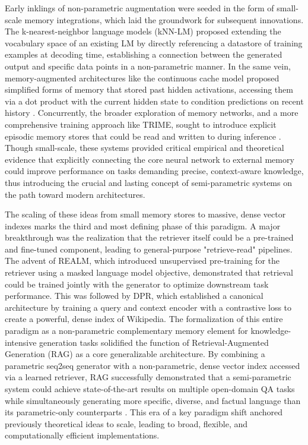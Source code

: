 \documentclass[11pt,a4paper]{article}
\begin{document}
Early inklings of non-parametric augmentation were seeded in the form of small-scale memory integrations, which laid the groundwork for subsequent innovations. The k-nearest-neighbor language models (kNN-LM) proposed extending the vocabulary space of an existing LM by directly referencing a datastore of training examples at decoding time, establishing a connection between the generated output and specific data points in a non-parametric manner. In the same vein, memory-augmented architectures like the continuous cache model proposed simplified forms of memory that stored past hidden activations, accessing them via a dot product with the current hidden state to condition predictions on recent history \cite{arxiv:1612.04426v1}. Concurrently, the broader exploration of memory networks, and a more comprehensive training approach like TRIME, sought to introduce explicit episodic memory stores that could be read and written to during inference \cite{arxiv:2205.12674v3}. Though small-scale, these systems provided critical empirical and theoretical evidence that explicitly connecting the core neural network to external memory could improve performance on tasks demanding precise, context-aware knowledge, thus introducing the crucial and lasting concept of semi-parametric systems on the path toward modern architectures.

The scaling of these ideas from small memory stores to massive, dense vector indexes marks the third and most defining phase of this paradigm. A major breakthrough was the realization that the retriever itself could be a pre-trained and fine-tuned component, leading to general-purpose "retrieve-read" pipelines. The advent of REALM, which introduced unsupervised pre-training for the retriever using a masked language model objective, demonstrated that retrieval could be trained jointly with the generator to optimize downstream task performance. This was followed by DPR, which established a canonical architecture by training a query and context encoder with a contrastive loss to create a powerful, dense index of Wikipedia. The formalization of this entire paradigm as a non-parametric complementary memory element for knowledge-intensive generation tasks solidified the function of Retrieval-Augmented Generation (RAG) as a core generalizable architecture. By combining a parametric seq2seq generator with a non-parametric, dense vector index accessed via a learned retriever, RAG successfully demonstrated that a semi-parametric system could achieve state-of-the-art results on multiple open-domain QA tasks while simultaneously generating more specific, diverse, and factual language than its parametric-only counterparts \cite{arxiv:2005.11401v4,arxiv:2009.08553v4}. This era of a key paradigm shift anchored previously theoretical ideas to scale, leading to broad, flexible, and computationally efficient implementations.
\end{document}
